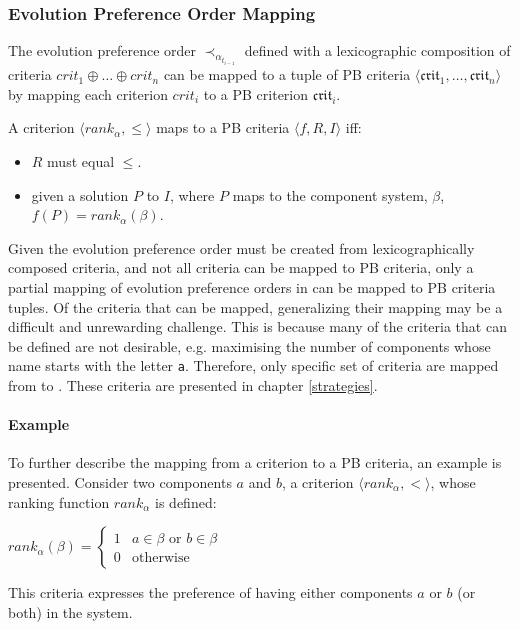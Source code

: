 \subsubsection{Evolution Preference Order Mapping}
The evolution preference order $\prec_{\alpha_{t_{i-1}}}$ defined with a lexicographic composition of criteria $crit_{1} \oplus \ldots \oplus crit_{n}$ 
can be mapped to a tuple of PB criteria $\langle \mathfrak{crit}_1,\ldots,\mathfrak{crit}_n\rangle$
by mapping each criterion $crit_{i}$ to a PB criterion $\mathfrak{crit}_i$.

A criterion $\langle rank_{\alpha} ,\leq \rangle$ maps to a PB criteria $\langle f, R , I \rangle$ iff:
\begin{itemize}
  \item $R$ must equal $\leq$.
  \item given a solution $P$ to $I$, where $P$ maps to the component system, $\beta$, $f(P) = rank_{\alpha}(\beta)$. 
\end{itemize} 

Given the evolution preference order must be created from lexicographically composed criteria,
and not all criteria can be mapped to PB criteria, only a partial mapping of evolution preference orders in \modelname can be mapped to PB criteria tuples.
Of the criteria that can be mapped, generalizing their mapping may be a difficult and unrewarding challenge.
This is because many of the criteria that can be defined are not desirable, e.g. maximising the number of components whose name starts with the letter \texttt{a}.
Therefore, only specific set of criteria are mapped from \modelname to \modelimpl.
These criteria are presented in chapter \ref{strategies}. 

\paragraph{Example}
To further describe the mapping from a criterion to a PB criteria, an example is presented.
Consider two components $a$ and $b$, a criterion $\langle rank_{\alpha},< \rangle$, whose ranking function $rank_{\alpha}$ is defined:

$rank_{\alpha}(\beta) = \begin{cases} 1 & a \in \beta \text{ or } b \in \beta\\ 0 & \text{otherwise} \end{cases}$

This criteria expresses the preference of having either components $a$ or $b$ (or both) in the system.

